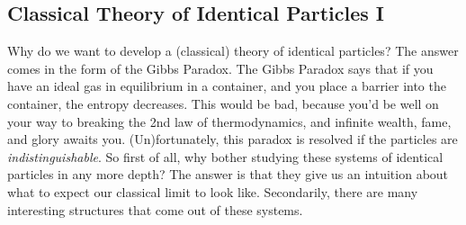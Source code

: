 \documentclass{article}
\begin{document}
\subsection{Classical Theory of Identical Particles I}
Why do we want to develop a (classical) theory of identical particles? The answer comes in the form of the Gibbs Paradox. The Gibbs Paradox says that if you have an ideal gas in equilibrium in a container, and you place a barrier into the container, the entropy decreases. This would be bad, because you'd be well on your way to breaking the 2nd law of thermodynamics, and infinite wealth, fame, and glory awaits you. (Un)fortunately, this paradox is resolved if the particles are \textit{indistinguishable}. So first of all, why bother studying these systems of identical particles in any more depth? The answer is that they give us an intuition about what to expect our classical limit to look like. Secondarily, there are many interesting structures that come out of these systems.
\end{document}
